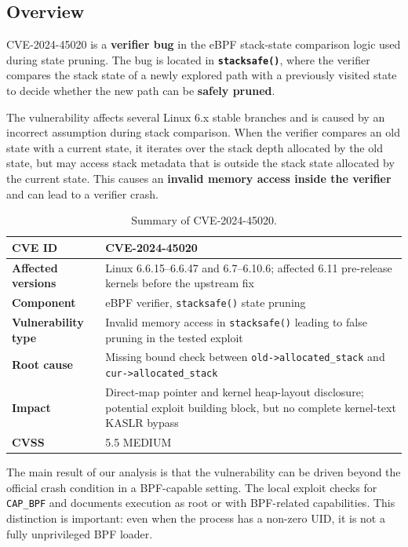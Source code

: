 \documentclass[../main.tex]{subfiles}
\begin{document}
\subsection{Overview}

CVE-2024-45020 is a \textbf{verifier bug} in the eBPF stack-state comparison logic used during state pruning. The bug is located in \textbf{\texttt{stacksafe()}}, where the verifier compares the stack state of a newly explored path with a previously visited state to decide whether the new path can be \textbf{safely pruned}.

The vulnerability affects several Linux 6.x stable branches and is caused by an incorrect assumption during stack comparison. When the verifier compares an old state with a current state, it iterates over the stack depth allocated by the old state, but may access stack metadata that is outside the stack state allocated by the current state. This causes an \textbf{invalid memory access inside the verifier} and can lead to a verifier crash.

\begin{table}[H]
\centering
\begin{tabularx}{\textwidth}{|l|X|}
\hline
\textbf{CVE ID} & CVE-2024-45020 \\
\hline
\textbf{Affected versions} & Linux 6.6.15--6.6.47 and 6.7--6.10.6; affected 6.11 pre-release kernels before the upstream fix \\
\hline
\textbf{Component} & eBPF verifier, \texttt{stacksafe()} state pruning \\
\hline
\textbf{Vulnerability type} & Invalid memory access in \texttt{stacksafe()} leading to false pruning in the tested exploit \\
\hline
\textbf{Root cause} & Missing bound check between \texttt{old->allocated\_stack} and \texttt{cur->allocated\_stack} \\
\hline
\textbf{Impact} & Direct-map pointer and kernel heap-layout disclosure; potential exploit building block, but no complete kernel-text KASLR bypass \\
\hline
\textbf{CVSS} & 5.5 MEDIUM \\
\hline
\end{tabularx}
\caption{Summary of CVE-2024-45020.}
\end{table}

The main result of our analysis is that the vulnerability can be driven beyond the official crash condition in a BPF-capable setting. The local exploit checks for \texttt{CAP\_BPF} and documents execution as root or with BPF-related capabilities. This distinction is important: even when the process has a non-zero UID, it is not a fully unprivileged BPF loader.
\end{document}
